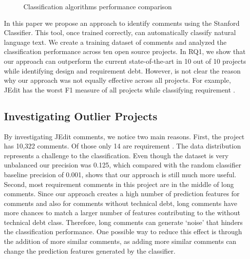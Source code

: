 \begin{figure}[!thb]
  \centering
  \caption{Classification algorithms performance comparison}
  \label{fig:algorithms_comparison}
\end{figure}

In this paper we propose an approach to identify \SATD comments using the Stanford Classifier. This tool, once trained correctly, can automatically classify natural language text. We create a training dataset of \SATD comments and analyzed the classification performance across ten open source projects. In RQ1, we show that our approach can outperform the current state-of-the-art in 10 out of 10 projects while identifying design and requirement debt. However, is not clear the reason why our approach was not equally effective across all projects. For example, JEdit has the worst F1 measure of all projects while classifying requirement \SATD.

\subsection{Investigating Outlier Projects}
By investigating JEdit comments, we notice two main reasons. First, the project has 10,322 comments. Of those only 14 are requirement \SATD. The data distribution represents a challenge to the classification. Even though the dataset is very unbalanced our precision was 0.125, which compared with the random classifier baseline precision of 0.001, shows that our approach is still much more useful. Second, most requirement \SATD comments in this project are in the middle of long comments. Since our approach creates a high number of prediction features for \SATD comments and also for comments without technical debt, long comments have more chances to match a larger number of features contributing to the without technical debt class. Therefore, long comments can generate `noise' that hinders the classification performance. One possible way to reduce this effect is through the addition of more similar comments, as adding more similar comments can change the prediction features generated by the classifier. 


